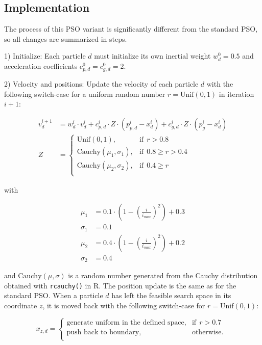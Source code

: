 \documentclass[
  oneside, a4paper, 12pt, openany]{book}
\theoremstyle{definition}
\theoremstyle{definition}
\theoremstyle{definition}
\theoremstyle{definition}
\theoremstyle{remark}
\begin{document}
\hypertarget{implementation-2}{%
\subsection{Implementation}\label{implementation-2}}

The process of this PSO variant is significantly different from the standard PSO, so all changes are summarized in steps.

1) Initialize: Each particle \(d\) must initialize its own inertial weight \(w_d^0=0.5\) and acceleration coefficients \(c_{p,d}^0 = c_{g,d}^0 = 2\).

2) Velocity and positions: Update the velocity of each particle \(d\) with the following switch-case for a uniform random number \(r = \text{Unif}(0,1)\) in iteration \(i+1\):

\begin{align*}
  v_d^{i+1} &= w_d^i \cdot v_d^{i}+c_{p,d}^i \cdot Z \cdot (p_{p,d}^i-x_d^i) + c_{g,d}^i \cdot Z \cdot (p_{g}^i-x_d^i) \\
  Z &= \begin{cases}
    \text{Unif}(0,1), & \text{if}\ \ r > 0.8\\
    \text{Cauchy}(\mu_1, \sigma_1), & \text{if}\ \ 0.8 \geq r > 0.4\\
    \text{Cauchy}(\mu_2, \sigma_2), & \text{if}\ \ 0.4 \geq r\\
  \end{cases}
\end{align*}

with

\begingroup
\allowdisplaybreaks

\begin{align*}
  \mu_1 &= 0.1 \cdot (1-(\frac{i}{i_{max}})^2) + 0.3 \\
  \sigma_1 &= 0.1 \\
  \mu_2 &= 0.4 \cdot (1-(\frac{i}{i_{max}})^2) + 0.2 \\
  \sigma_2 &= 0.4
\end{align*}
\endgroup

and \(\text{Cauchy}(\mu, \sigma)\) is a random number generated from the Cauchy distribution obtained with \texttt{rcauchy()} in R. The position update is the same as for the standard PSO. When a particle \(d\) has left the feasible search space in its coordinate \(z\), it is moved back with the following switch-case for \(r = \text{Unif}(0,1)\):

\[
  x_{z,d} = 
  \begin{cases}
    \text{generate uniform in the defined space}, & \text{if}\ \ r > 0.7\\
    \text{push back to boundary}, & \text{otherwise.}\ \ \\
  \end{cases}
\]
\end{document}
